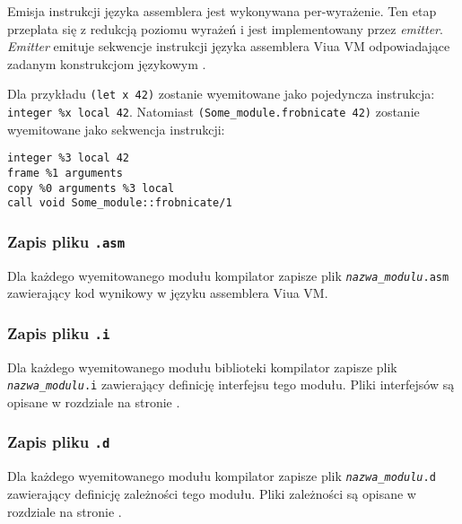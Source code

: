 Emisja instrukcji języka assemblera jest wykonywana per-wyrażenie. Ten etap przeplata się z redukcją poziomu
wyrażeń i jest implementowany przez \emph{emitter}. \emph{Emitter} emituje sekwencje instrukcji języka
assemblera Viua VM odpowiadające zadanym konstrukcjom językowym \ViuAct.

Dla przykładu \texttt{(let x 42)} zostanie wyemitowane jako pojedyncza instrukcja: \texttt{integer \%x local
42}.  Natomiast \texttt{(Some\_module.frobnicate 42)} zostanie wyemitowane jako sekwencja instrukcji:

\begin{lstlisting}
integer %3 local 42
frame %1 arguments
copy %0 arguments %3 local
call void Some_module::frobnicate/1
\end{lstlisting}

\subsubsection{Zapis pliku \texttt{.asm}}

Dla każdego wyemitowanego modułu kompilator zapisze plik \texttt{\emph{nazwa\_modulu}.asm} zawierający kod
wynikowy w języku assemblera Viua VM.

\subsubsection{Zapis pliku \texttt{.i}}

Dla każdego wyemitowanego modułu biblioteki kompilator zapisze plik \texttt{\emph{nazwa\_modulu}.i}
zawierający definicję interfejsu tego modułu. Pliki interfejsów są opisane w rozdziale
 na stronie \pageref{pliki_interfejsow_modulow}.

\subsubsection{Zapis pliku \texttt{.d}}

Dla każdego wyemitowanego modułu kompilator zapisze plik \texttt{\emph{nazwa\_modulu}.d}
zawierający definicję zależności tego modułu. Pliki zależności są opisane w rozdziale
 na stronie \pageref{pliki_zaleznosci_modulow}.
